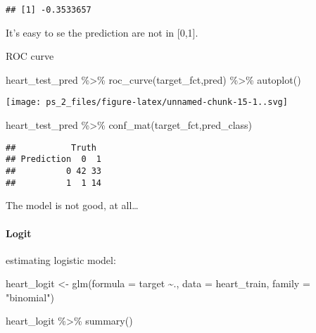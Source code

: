 \documentclass[
]{article}
\newenvironment{Shaded}{\begin{snugshade}}{\end{snugshade}}
\newcommand{\AttributeTok}[1]{\textcolor[rgb]{0.77,0.63,0.00}{#1}}
\newcommand{\FunctionTok}[1]{\textcolor[rgb]{0.00,0.00,0.00}{#1}}
\newcommand{\NormalTok}[1]{#1}
\newcommand{\OtherTok}[1]{\textcolor[rgb]{0.56,0.35,0.01}{#1}}
\newcommand{\SpecialCharTok}[1]{\textcolor[rgb]{0.00,0.00,0.00}{#1}}
\newcommand{\StringTok}[1]{\textcolor[rgb]{0.31,0.60,0.02}{#1}}
\begin{document}
\begin{verbatim}
## [1] -0.3533657
\end{verbatim}

It's easy to se the prediction are not in {[}0,1{]}.

ROC curve

\begin{Shaded}
\begin{Highlighting}[]
\NormalTok{heart\_test\_pred }\SpecialCharTok{\%\textgreater{}\%}
  \FunctionTok{roc\_curve}\NormalTok{(target\_fct,pred) }\SpecialCharTok{\%\textgreater{}\%} \FunctionTok{autoplot}\NormalTok{()}
\end{Highlighting}
\end{Shaded}

\texttt{[image: ps\_2\_files/figure-latex/unnamed-chunk-15-1..svg]}

\begin{Shaded}
\begin{Highlighting}[]
\NormalTok{ heart\_test\_pred  }\SpecialCharTok{\%\textgreater{}\%}
  \FunctionTok{conf\_mat}\NormalTok{(target\_fct,pred\_class)}
\end{Highlighting}
\end{Shaded}

\begin{verbatim}
##           Truth
## Prediction  0  1
##          0 42 33
##          1  1 14
\end{verbatim}

The model is not good, at all\ldots{}

\hypertarget{logit}{%
\paragraph{Logit}\label{logit}}

estimating logistic model:

\begin{Shaded}
\begin{Highlighting}[]
\NormalTok{heart\_logit }\OtherTok{\textless{}{-}} \FunctionTok{glm}\NormalTok{(}\AttributeTok{formula =}\NormalTok{ target }\SpecialCharTok{\textasciitilde{}}\NormalTok{.,}
                   \AttributeTok{data =}\NormalTok{ heart\_train,}
                   \AttributeTok{family =} \StringTok{"binomial"}\NormalTok{)}

\NormalTok{heart\_logit }\SpecialCharTok{\%\textgreater{}\%} \FunctionTok{summary}\NormalTok{()}
\end{Highlighting}
\end{Shaded}
\end{document}
